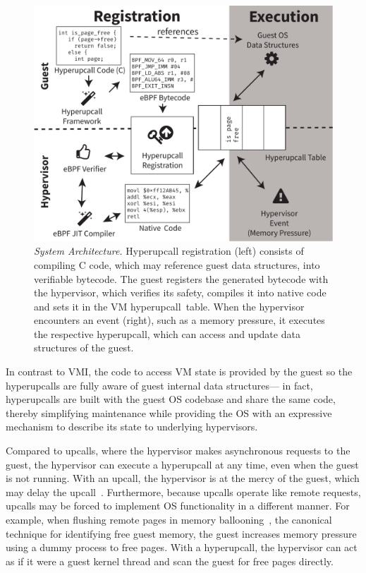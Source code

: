 \documentclass[11pt]{article}
\newcommand{\Hypercallback}{Hyperupcall\xspace{}}
\newcommand{\hypercallback}{hyperupcall\xspace{}}
\begin{document}
\begin{figure}[t!]
	\centering
	\includegraphics[width=\columnwidth]{figs/architecture.pdf}
	\caption{\emph{System Architecture.} \Hypercallback{} registration (left) consists of 
	compiling C code, which may reference guest data structures, into verifiable bytecode. 
	The guest registers the generated bytecode with the hypervisor, which verifies its safety, 
	compiles it into native code and sets it in the VM \hypercallback~table. When the 
	hypervisor encounters an event (right), such as a memory pressure, it executes the respective 
	\hypercallback, which can access and update data structures of the guest.}
	\label{fig:system_overview}
    \end{figure}
    
In contrast to VMI, the code to access VM state is provided by the guest 
so the \hypercallback{}s are fully aware of guest internal data structures---
in fact, \hypercallback{}s are built with the guest OS codebase and share the same code, 
thereby simplifying maintenance while providing the OS with an expressive mechanism to 
describe its state to underlying hypervisors. 

Compared to upcalls, where the hypervisor makes asynchronous requests to the guest, 
the hypervisor can execute a \hypercallback{} at any time, even when the guest is not running. 
With an upcall, the hypervisor is at the mercy of the guest, which may delay the upcall~\cite{arya2014tesseract}. 
Furthermore, because upcalls operate like remote requests, upcalls may be forced to implement OS functionality in 
a different manner. For example, when flushing remote pages in memory ballooning~\cite{waldspurger2002memory}, 
the canonical technique for identifying free guest memory,
the guest increases memory pressure using a dummy process to free pages. With a \hypercallback, 
the hypervisor can act as if it were a guest kernel thread and scan the guest for free pages directly.
\end{document}
